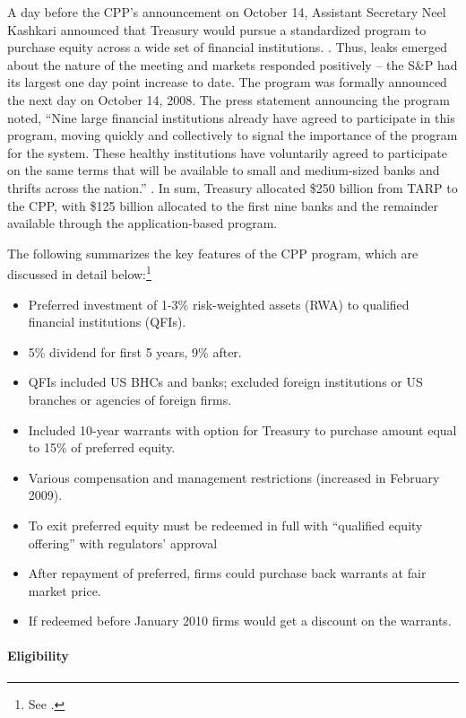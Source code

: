 \documentclass[12pt]{article}
\begin{document}
A day before the CPP's announcement on October 14, Assistant Secretary Neel Kashkari announced that Treasury would pursue a standardized program to purchase equity across a wide set of financial institutions. \citep{Ba}. Thus, leaks emerged about the nature of the meeting and markets responded positively -- the S\&P had its largest one day point increase to date. The program was formally announced the next day on October 14, 2008. The press statement announcing the program noted, ``Nine large financial institutions already have agreed to participate in this program, moving quickly and collectively to signal the importance of the program for the system. These healthy institutions have voluntarily agreed to participate on the same terms that will be available to small and medium-sized banks and thrifts across the nation.'' \citep{CPPAnnouncement}. In sum, Treasury allocated \$250 billion from TARP to the CPP, with \$125 billion allocated to the first nine banks and the remainder available through the application-based program.

The following summarizes the key features of the CPP program, which are discussed in detail below:\footnote{See \citet{mofo}.}

\begin{itemize}[label={--}]
\item Preferred investment of 1-3\% risk-weighted assets (RWA) to qualified financial institutions (QFIs).
\item 5\% dividend for first 5 years, 9\% after.
\item QFIs included US BHCs and banks; excluded foreign institutions or US branches or agencies of foreign firms.
\item Included 10-year warrants with option for Treasury to purchase amount equal to 15\% of preferred equity.
\item Various compensation and management restrictions (increased in February 2009).
\item To exit preferred equity must be redeemed in full with ``qualified equity offering'' with regulators' approval
\item After repayment of preferred, firms could purchase back warrants at fair market price.
\item If redeemed before January 2010 firms would get a discount on the warrants.
\end{itemize}

\paragraph{Eligibility}
\end{document}
